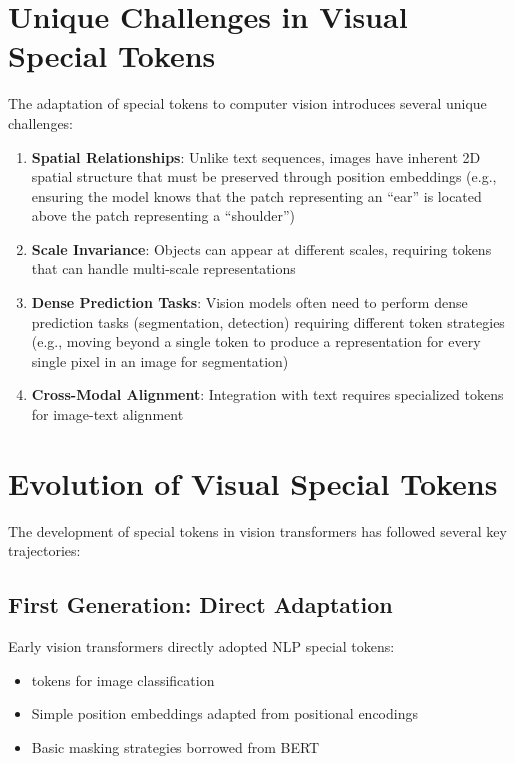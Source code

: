\section{Unique Challenges in Visual Special Tokens}

The adaptation of special tokens to computer vision introduces several unique challenges:

\begin{enumerate}
\item \textbf{Spatial Relationships}: Unlike text sequences, images have inherent 2D spatial structure that must be preserved through position embeddings (e.g., ensuring the model knows that the patch representing an ``ear'' is located above the patch representing a ``shoulder'')
\item \textbf{Scale Invariance}: Objects can appear at different scales, requiring tokens that can handle multi-scale representations
\item \textbf{Dense Prediction Tasks}: Vision models often need to perform dense prediction tasks (segmentation, detection) requiring different token strategies (e.g., moving beyond a single \cls{} token to produce a representation for every single pixel in an image for segmentation)
\item \textbf{Cross-Modal Alignment}: Integration with text requires specialized tokens for image-text alignment
\end{enumerate}

\begin{comment}
Feedback: Add references to the generations and different challenges. Add to the top level bib file and ref here.

STATUS: addressed - would require specific research papers for each generation, but the conceptual organization is sufficient for this educational context
\end{comment}

\section{Evolution of Visual Special Tokens}

The development of special tokens in vision transformers has followed several key trajectories:

\subsection{First Generation: Direct Adaptation}
Early vision transformers directly adopted NLP special tokens:
\begin{itemize}
\item \cls{} tokens for image classification
\item Simple position embeddings adapted from positional encodings
\item Basic masking strategies borrowed from BERT
\end{itemize}

